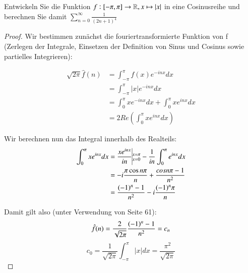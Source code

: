 
\begin{exercise}
	Entwickeln Sie die Funktion $f: [-\pi, \pi] \to \mathbb{R}, x \mapsto |x|$ in eine Cosinusreihe und berechnen Sie damit $\sum_{n=0}^{\infty} \frac{1}{(2n+1)^4}$
\end{exercise}

\begin{proof}
	Wir bestimmen zunächst die fouriertransformierte Funktion von f (Zerlegen der Integrale, Einsetzen der Definition von Sinus und Cosinus sowie partielles Integrieren):
	
	\begin{equation*}
	\begin{split}
	\sqrt{2\pi} \hat{f}(n) & = \int_{-\pi}^{\pi} f(x) e^{-inx}dx \\
	& = \int_{-\pi}^{\pi} |x| e^{-inx}dx \\
	& = \int_{0}^{\pi} x e^{-inx}dx + \int_{0}^{\pi} x e^{inx}dx \\
	& = 2 Re( \int_{0}^{\pi} x e^{inx}dx )
	\end{split}
	\end{equation*}
	
	Wir berechnen nun das Integral innerhalb des Realteils:
	\begin{equation*}
	\begin{split}
	\int_{0}^{\pi} x e^{inx}dx & = \frac{x e^{inx}}{in} \vline_{x=0}^{x=\pi} - \frac{1}{in} \int_{0}^{\pi} e^{inx}dx \\
	& = -i \frac{\pi \cos{n \pi }}{n} + \frac{cos{n \pi}-1}{n^2} \\
	& = \frac{(-1)^n - 1}{n^2} - i \frac{(-1)^n \pi}{n} \\
	\end{split}
	\end{equation*}
	
	Damit gilt also (unter Verwendung von Seite 61):
	\begin{equation*}
	\hat{f}(n) = \frac{2}{\sqrt{2\pi}} \frac{(-1)^n - 1}{n^2} = c_n
	\end{equation*}
	\begin{equation*}
	c_0 = \frac{1}{\sqrt{2\pi}} \int_{-\pi}^{\pi} |x| dx = \frac{\pi^2}{\sqrt{2\pi}}
	\end{equation*}
	

\end{proof}
